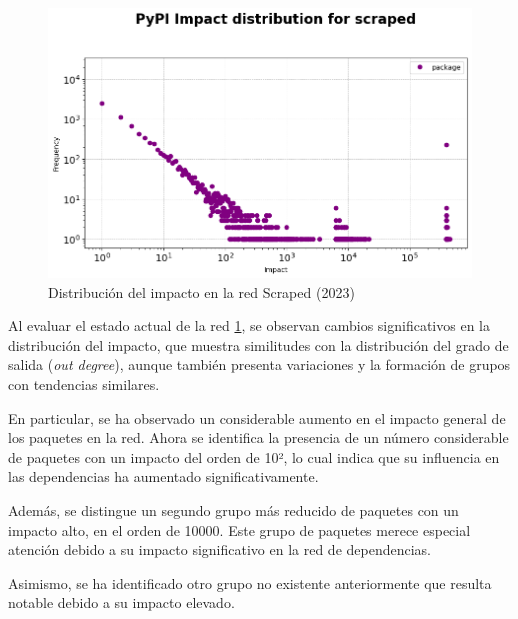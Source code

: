 \begin{figure}[ht!]
    \begin{center}
        \includegraphics[width=1\textwidth]{img/pypi/scraped_impact_distribution.png}
        \caption{Distribución del impacto en la red Scraped (2023)}
        \label{fig:Distribución del impacto en la red Scraped}
    \end{center}
\end{figure}

Al evaluar el estado actual de la red \ref{fig:Distribución del impacto en la red Scraped}, se observan cambios significativos en la distribución del
impacto, que muestra similitudes con la distribución del grado de salida (\textit{out degree}),
aunque también presenta variaciones y la formación de grupos con tendencias similares.

En particular, se ha observado un considerable aumento en el impacto general de los paquetes en la
red. Ahora se identifica la presencia de un número considerable de paquetes con un impacto del orden
de 10², lo cual indica que su influencia en las dependencias ha aumentado
significativamente.

Además, se distingue un segundo grupo más reducido de paquetes con un impacto alto, en el orden de 10000.
Este grupo de paquetes merece especial atención debido a su impacto significativo
en la red de dependencias.

Asimismo, se ha identificado otro grupo no existente anteriormente que resulta notable debido a
su impacto elevado.

